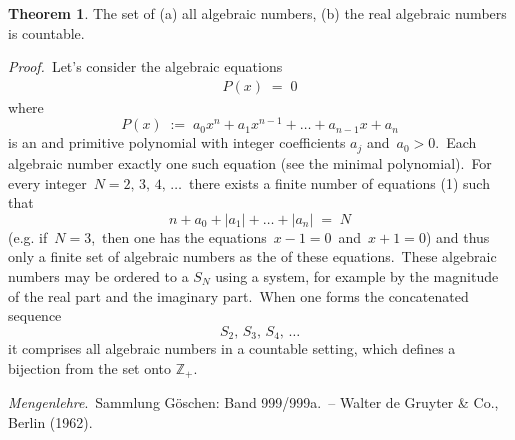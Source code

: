 \documentclass[12pt]{article}
\theoremstyle{definition}
\newtheorem*{thmplain}{Theorem}
\begin{document}
\begin{thmplain}
The set of (a) all algebraic numbers, (b) the real algebraic numbers is countable.
\end{thmplain}

{\em Proof.}\, Let's consider the algebraic equations
\begin{align}
                 P(x) \;=\; 0
\end{align}
where 
     $$P(x) \;:=\; a_0x^n\!+\!a_1x^{n-1}\!+\!\ldots\!+\!a_{n-1}x\!+\!a_n$$
is an  and primitive polynomial with integer coefficients $a_j$ and\, $a_0 > 0$.\, Each algebraic number  exactly one such equation (see the minimal polynomial).\, For every integer\, $N = 2,\,3,\,4,\,\ldots$\, there exists a finite number of equations (1) such that
     $$n\!+\!a_0\!+\!|a_1|\!+\ldots+\!|a_n| \;=\; N$$
(e.g. if\, $N = 3$,\, then one has the equations\, $x\!-\!1 = 0$\, and\, 
$x\!+\!1 = 0$) and thus only a finite set of algebraic numbers as the  of these equations.\, These algebraic numbers may be ordered to a  $S_N$ using a  system, for example by the magnitude of the real part and the imaginary part.\, When one forms the concatenated sequence
        $$S_2,\,S_3,\,S_4,\,\ldots$$
it comprises all algebraic numbers in a countable setting, which defines a bijection from the set onto $\mathbb{Z}_+$.

\begin{thebibliography}{9}
 {\em Mengenlehre}.\, Sammlung G\"oschen: Band 999/999a.\, -- Walter de Gruyter \& Co., Berlin (1962).
\end{thebibliography}
\end{document}
